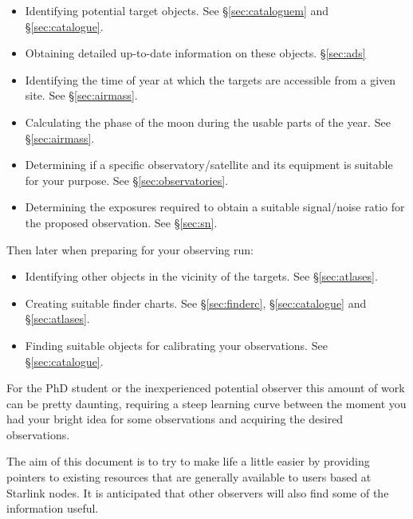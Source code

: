 \documentclass[twoside,11pt]{article}
\newcommand{\htmladdnormallink}[2]{#1}
\newcommand{\STARLINKref}{\htmladdnormallink{Starlink}{http://www.starlink.ac.uk/}}
\begin{document}
\begin{itemize}
\item Identifying potential target objects. See \S{\ref{sec:cataloguem}} and \S{\ref{sec:catalogue}}.

\item Obtaining detailed up-to-date information on these objects. \S{\ref{sec:ads}}

\item Identifying the time of year at which the targets are accessible
      from a given site. See \S{\ref{sec:airmass}}.

\item Calculating the phase of the moon during the usable parts of the year. See
      \S{\ref{sec:airmass}}.

\item Determining if a specific observatory/satellite and its
      equipment is suitable for your purpose. See \S{\ref{sec:observatories}}.

\item Determining the exposures required to obtain
      a suitable signal/noise ratio for the proposed observation. See \S{\ref{sec:sn}}.

\end{itemize}

Then later when preparing for your observing run:

\begin{itemize}
\item Identifying other objects in the vicinity of the targets. See \S{\ref{sec:atlases}}.

\item Creating suitable finder charts. See \S{\ref{sec:finderc}}, \S{\ref{sec:catalogue}} and
      \S{\ref{sec:atlases}}.

\item Finding suitable objects for calibrating your observations. See \S{\ref{sec:catalogue}}.
\end{itemize}

For the PhD student or the inexperienced potential observer this amount of
work can be pretty daunting, requiring a steep learning curve between the
moment you had your bright idea for some observations and acquiring
the desired observations.

The aim of this document is to try to make life a little easier by
providing pointers to existing resources that are generally available
to users based at {\STARLINKref} nodes. It is anticipated that other
observers will also find some of the information useful.
\end{document}
